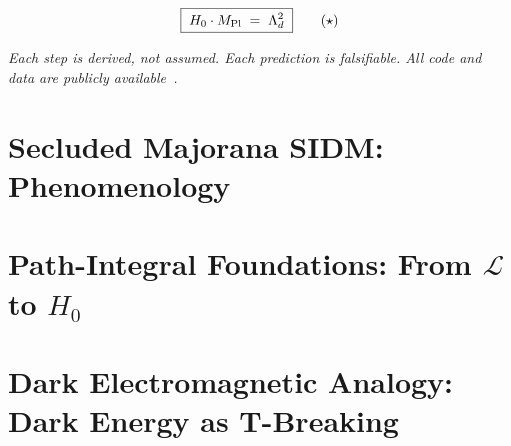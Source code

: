 \documentclass[12pt,a4paper]{article}
\begin{document}
\medskip
\begin{equation}
  \boxed{\;H_0 \cdot M_{\rm Pl} \;=\; \Lambda_d^2\;}
  \tag{$\star$}
\end{equation}

\medskip
\noindent
\textit{Each step is derived, not assumed. Each prediction is falsifiable.
All code and data are publicly available~\cite{SIDMcode2026}.}

\newpage
\part{Secluded Majorana SIDM: Phenomenology}
\label{part:sidm}



\part{Path-Integral Foundations: From \texorpdfstring{$\mathcal{L}$}{L} to \texorpdfstring{$H_0$}{H0}}
\label{part:pathintegral}



\part{Dark Electromagnetic Analogy: Dark Energy as T-Breaking}
\label{part:duality}



\appendix

\end{document}
